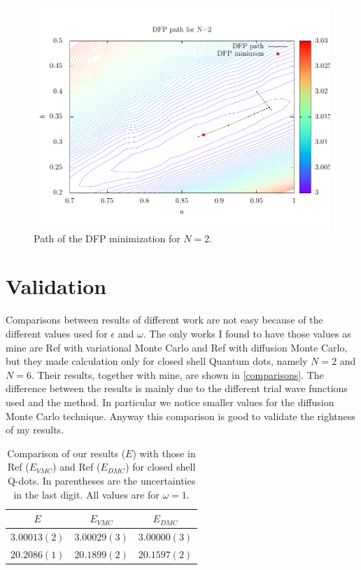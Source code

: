 \begin{figure}[h]
  \centering
  \includegraphics[width=\textwidth]{Graphics/contour2.pdf}
  \caption{Path of the DFP minimization for $N=2$.}
  \label{contour}
\end{figure}

\section{Validation}

Comparisons between results of different work are not easy because of the different values used for $\epsilon$ and $\omega$.
The only works I found to have those values as mine are Ref\cite{larsevind} with variational Monte Carlo and Ref\cite{PedersenLohne2011} with diffusion Monte Carlo, but they made calculation only for closed shell Quantum dots, namely $N=2$ and $N=6$.
Their results, together with mine, are shown in \autoref{comparisons}.
The difference between the results is mainly due to the different trial wave functions used and the method.
In particular we notice smaller values for the diffusion Monte Carlo technique.
Anyway this comparison is good to validate the rightness of my results.

\begin{table}[H]
  \centering
  \begin{tabular}{c|c|c}
    \toprule
    $E$ & $E_{VMC}$ & $E_{DMC}$ \\
    \hline
    $3.00013(2)$ & $3.00029(3)$ & $3.00000(3)$ \\
    $20.2086(1)$ & $20.1899(2)$ & $20.1597(2)$ \\
    \bottomrule
  \end{tabular}
  \caption[Comparison of our results with those in Ref\cite{larsevind} and Ref\cite{PedersenLohne2011} for closed shell Q-dots.]{Comparison of our results ($E$) with those in Ref\cite{larsevind} ($E_{VMC}$) and Ref\cite{PedersenLohne2011} ($E_{DMC}$) for closed shell Q-dots. In parentheses are the uncertainties in the last digit. All values are for $\omega=1$.}
  \label{comparisons}
\end{table}
